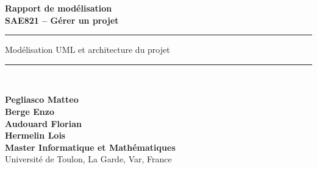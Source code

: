 \documentclass{article}
\date{\vspace{1cm} \today}
\newcommand{\HRule}{\rule{\linewidth}{0.5mm}}
\begin{document}
\begin{titlepage}
    \centering

    \vspace*{2cm}

    {\Huge\bfseries Rapport de modélisation\\[0.5em] \LARGE SAE821 -- Gérer un projet}

    \vspace{1.5cm}

    \HRule
    \vspace{0.5cm}

    \Large{Modélisation UML et architecture du projet}

    \vspace{0.5cm}
    \HRule\\[11cm]

    \begin{flushleft}
        \small
        \textbf{Pegliasco Matteo}\\
        \textbf{Berge Enzo}\\
        \textbf{Audouard Florian}\\
        \textbf{Hermelin Lois}\\
        \textbf{Master Informatique et Mathématiques}\\
        Université de Toulon, La Garde, Var, France
    \end{flushleft}
    \vfill
\end{titlepage}
\end{document}
